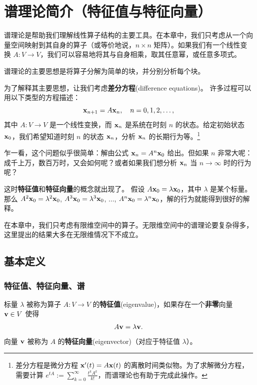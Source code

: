 

\chapter{谱理论简介（特征值与特征向量）}\label{chap:04}

谱理论是帮助我们理解线性算子结构的主要工具。在本章中，我们只考虑从一个向量空间映射到其自身的算子（或等价地说，$n \times n$ 矩阵）。如果我们有一个线性变换 $A: V \to V$，我们可以容易地将其与自身相乘，取其任意幂，或任意多项式。

谱理论的主要思想是将算子分解为简单的块，并分别分析每个块。

为了解释其主要思想，让我们考虑\textbf{差分方程}(difference equations)。
许多过程可以用以下类型的方程描述：
$$\mathbf{x}_{n+1} = A\mathbf{x}_n,\quad n = 0, 1, 2, \dots,$$
其中 $A: V \to V$ 是一个线性变换，而 $\mathbf{x}_n$ 是系统在时刻 $n$ 的状态。给定初始状态 $\mathbf{x}_0$，我们希望知道时刻 $n$ 的状态 $\mathbf{x}_n$，分析 $\mathbf{x}_n$ 的长期行为等。\footnote{
差分方程是微分方程 $\mathbf{x}'(t) = A\mathbf{x}(t)$ 的离散时间类似物。为了求解微分方程，需要计算 $e^{tA} := \sum_{k=0}^\infty \frac{t^k A^k}{k!}$，而谱理论也有助于完成此操作。}


乍一看，这个问题似乎很简单：解由公式 $\mathbf{x}_n = A^n \mathbf{x}_0$ 给出。但如果 $n$ 非常大呢：成千上万，数百万时，又会如何呢？或者如果我们想分析 $\mathbf{x}_n$ 当 $n \to \infty$ 时的行为呢？

这时\textbf{特征值}和\textbf{特征向量}的概念就出现了。
假设 $A\mathbf{x}_0 = \lambda \mathbf{x}_0$，其中 $\lambda$ 是某个标量。那么 $A^2 \mathbf{x}_0 = \lambda^2 \mathbf{x}_0$, $A^3 \mathbf{x}_0 = \lambda^3 \mathbf{x}_0$, $\dots$, $A^n \mathbf{x}_0 = \lambda^n \mathbf{x}_0$，解的行为就能得到很好的解释。

在本章中，我们只考虑有限维空间中的算子。无限维空间中的谱理论要复杂得多，这里提出的结果大多在无限维情况下不成立。

\section{基本定义}\label{sec:04-01}

\subsection{特征值、特征向量、谱}\label{sec:04-01-01}

标量 $\lambda$ 被称为算子 $A: V \to V$ 的\textbf{特征值}(eigenvalue)，如果存在一个\textbf{非零}向量 $\mathbf{v} \in V$ 使得 $$A\mathbf{v} = \lambda \mathbf{v}.$$
向量 $\mathbf{v}$ 被称为 $A$ 的\textbf{特征向量}(eigenvector)（对应于特征值 $\lambda$）。

